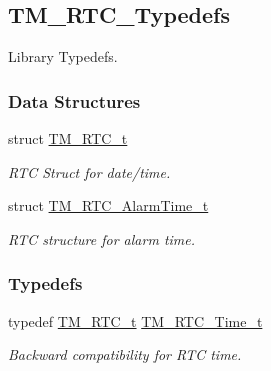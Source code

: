 \hypertarget{group___t_m___r_t_c___typedefs}{}\subsection{T\+M\+\_\+\+R\+T\+C\+\_\+\+Typedefs}
\label{group___t_m___r_t_c___typedefs}


Library Typedefs.  


\subsubsection*{Data Structures}
\begin{DoxyCompactItemize}
\item 
struct \hyperlink{struct_t_m___r_t_c__t}{T\+M\+\_\+\+R\+T\+C\+\_\+t}
\begin{DoxyCompactList}\small\item\em R\+T\+C Struct for date/time. \end{DoxyCompactList}\item 
struct \hyperlink{struct_t_m___r_t_c___alarm_time__t}{T\+M\+\_\+\+R\+T\+C\+\_\+\+Alarm\+Time\+\_\+t}
\begin{DoxyCompactList}\small\item\em R\+T\+C structure for alarm time. \end{DoxyCompactList}\end{DoxyCompactItemize}
\subsubsection*{Typedefs}
\begin{DoxyCompactItemize}
\item 
\hypertarget{group___t_m___r_t_c___typedefs_gaeb7262d02f6cc61342a91b78d7429805}{}typedef \hyperlink{struct_t_m___r_t_c__t}{T\+M\+\_\+\+R\+T\+C\+\_\+t} \hyperlink{group___t_m___r_t_c___typedefs_gaeb7262d02f6cc61342a91b78d7429805}{T\+M\+\_\+\+R\+T\+C\+\_\+\+Time\+\_\+t}\label{group___t_m___r_t_c___typedefs_gaeb7262d02f6cc61342a91b78d7429805}

\begin{DoxyCompactList}\small\item\em Backward compatibility for R\+T\+C time. \end{DoxyCompactList}\end{DoxyCompactItemize}
